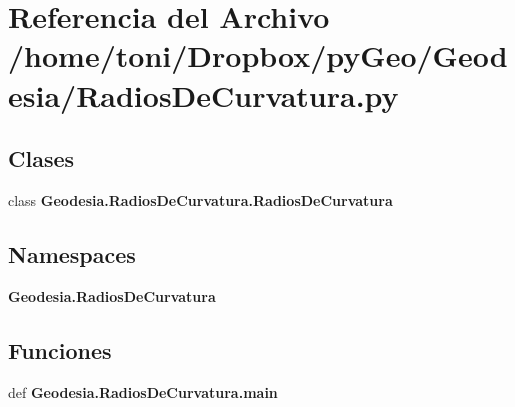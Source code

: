 \section{Referencia del Archivo /home/toni/\-Dropbox/py\-Geo/\-Geodesia/\-Radios\-De\-Curvatura.py}
\label{RadiosDeCurvatura_8py}
\subsection*{Clases}
\begin{DoxyCompactItemize}
\item 
class {\bf Geodesia.\-Radios\-De\-Curvatura.\-Radios\-De\-Curvatura}
\end{DoxyCompactItemize}
\subsection*{Namespaces}
\begin{DoxyCompactItemize}
\item 
{\bf Geodesia.\-Radios\-De\-Curvatura}
\end{DoxyCompactItemize}
\subsection*{Funciones}
\begin{DoxyCompactItemize}
\item 
def {\bf Geodesia.\-Radios\-De\-Curvatura.\-main}
\end{DoxyCompactItemize}
